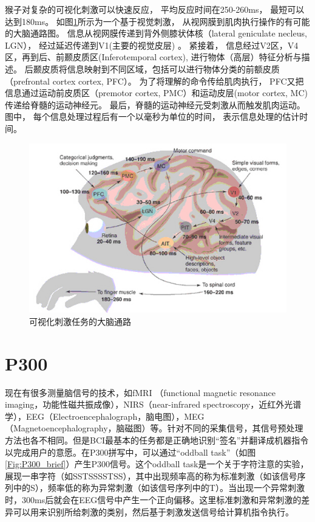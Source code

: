 猴子对复杂的可视化刺激可以快速反应， 平均反应时间在250-260ms， 最短可以达到180ms。 如图\ref{Fig:brain_stimulate_flow}所示为一个基于视觉刺激， 从视网膜到肌肉执行操作的有可能的大脑通路图\cite{thorpe2001seeking}。 信息从视网膜传递到背外侧膝状体核（lateral geniculate necleus, LGN）， 经过延迟传递到V1(主要的视觉皮层) 。 紧接着， 信息经过V2区，V4区，再到后、前颞皮质区(Inferotemporal cortex), 进行物体（高层）特征分析与描述。 后颞皮质将信息映射到不同区域，包括可以进行物体分类的前额皮质（prefrontal cortex cortex, PFC）。 为了将理解的命令传给肌肉执行， PFC又把信息通过运动前皮质区（premotor cortex, PMC）和运动皮层(motor cortex, MC)传递给脊髓的运动神经元。 最后，脊髓的运动神经元受刺激从而触发肌肉运动。 图中， 每个信息处理过程后有一个以毫秒为单位的时间， 表示信息处理的估计时间。


\begin{figure}[htb]
\centering
\includegraphics{Pictures/Introduction/brain_flow.jpg}
\caption{可视化刺激任务的大脑通路}
\label{Fig:brain_stimulate_flow}
\end{figure}


\section{P300}


现在有很多测量脑信号的技术，如fMRI （functional magnetic resonance imaging，功能性磁共振成像），NIRS（near-infrared spectroscopy，近红外光谱学），EEG（Electroencephalograph，脑电图），MEG（Magnetoencephalography，脑磁图）等。针对不同的采集信号，其信号预处理方法也各不相同。但是BCI最基本的任务都是正确地识别“签名”并翻译成机器指令以完成用户的意愿。在P300拼写中，可以通过“oddball task”（如图\ref{Fig:P300_brief}）产生P300信号。这个oddball task是一个关于字符注意的实验，展现一串字符（如SSTSSSSTSS），其中出现频率高的称为标准刺激（如该信号序列中的S），频率低的称为异常刺激（如该信号序列中的T）。当出现一个异常刺激时，300ms后就会在EEG信号中产生一个正向偏移。这里标准刺激和异常刺激的差异可以用来识别所给刺激的类别，然后基于刺激发送信号给计算机指令执行。
 
